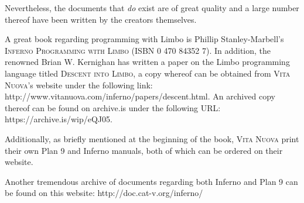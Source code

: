 \documentclass[a5paper,twoside,12pt]{report}
\begin{document}
Nevertheless, the documents that \textit{do} exist are of great quality and a large number thereof have been written by the creators themselves. 

A great book regarding programming with Limbo is Phillip Stanley-Marbell's \textsc{Inferno Programming with Limbo} (ISBN 0 470 84352 7). In addition, the renowned Brian W. Kernighan has written a paper on the Limbo programming language titled \textsc{Descent into Limbo}, a copy whereof can be obtained from \textsc{Vita Nuova}'s website under the following link: http://www.vitanuova.com/inferno/papers/descent.html. An archived copy thereof can be found on archive.is under the following URL: https://archive.is/wip/eQJ05.

Additionally, as briefly mentioned at the beginning of the book, \textsc{Vita Nuova} print their own Plan 9 and Inferno manuals, both of which can be ordered on their website.

Another tremendous archive of documents regarding both Inferno and Plan 9 can be found on this website: http://doc.cat-v.org/inferno/
\end{document}
